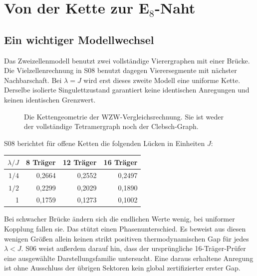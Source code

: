 \chapter{Von der Kette zur E\texorpdfstring{$_8$}{8}-Naht}
\label{ch:seam}
\section{Ein wichtiger Modellwechsel}
Das Zweizellenmodell benutzt zwei vollständige Vierergraphen mit einer Brücke. Die Vielzellenrechnung in S08 benutzt dagegen Vierersegmente mit nächster Nachbarschaft. Bei $\lambda=J$ wird erst dieses zweite Modell eine uniforme Kette. Derselbe isolierte Singulettzustand garantiert keine identischen Anregungen und keinen identischen Grenzwert.

\begin{figure}[H]\centering
{}
\caption{Die Kettengeometrie der WZW-Vergleichsrechnung. Sie ist weder der vollständige Tetramergraph noch der Clebsch-Graph.}
\end{figure}

S08 berichtet für offene Ketten die folgenden Lücken in Einheiten $J$:
\begin{center}
\begin{tabular}{rrrr}
\toprule $\lambda/J$&8 Träger&12 Träger&16 Träger\\\midrule
$1/4$&0,2664&0,2552&0,2497\\
$1/2$&0,2299&0,2029&0,1890\\
1&0,1759&0,1273&0,1002\\\bottomrule
\end{tabular}
\end{center}
Bei schwacher Brücke ändern sich die endlichen Werte wenig, bei uniformer Kopplung fallen sie. Das stützt einen Phasenunterschied. Es beweist aus diesen wenigen Größen allein keinen strikt positiven thermodynamischen Gap für jedes $\lambda<J$. S06 weist außerdem darauf hin, dass der ursprüngliche 16-Träger-Prüfer eine ausgewählte Darstellungsfamilie untersucht. Eine daraus erhaltene Anregung ist ohne Ausschluss der übrigen Sektoren kein global zertifizierter erster Gap.

